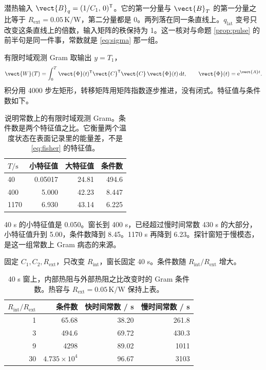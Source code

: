 潜热输入 \(\vect{B}_q=(1/C_1,\,0)^{\mathsf T}\)。它的第一分量与 \(\vect{B}_T\) 的第一分量之比等于 \(R_{\mathrm{ext}}=0.05\,\mathrm{K/W}\)，第二分量都是 0。两列落在同一条直线上。\(q_{\mathrm{lat}}\) 变号只改变这条直线上的倍数，输入矩阵的秩保持为 1。这一核对与命题 \ref{prop:pulse} 的前半句是同一件事，常数就是 \eqref{eq:sigma} 那一组。

有限时域观测 Gram 取输出 \(y=T_1\)，
\begin{equation}
\label{eq:gram}
\vect{W}(T)=\int_0^{T}\vect{\Phi}(t)^{\mathsf T}\vect{C}^{\mathsf T}\vect{C}\,\vect{\Phi}(t)\,\mathrm{d}t,
\qquad
\vect{\Phi}(t)=\mathrm{e}^{\vect{A}t}.
\end{equation}
积分用 4000 步左矩形，转移矩阵用矩阵指数逐步推进，没有闭式。特征值与条件数如下。

\begin{table}[ht]
\centering
\caption{说明常数上的有限时域观测 Gram。条件数是两个特征值之比。它衡量两个温度状态在表面记录里的能量差，不是 \eqref{eq:fisher} 的特征值。}
\begin{tabular}{lrrr}
\toprule
\(T/\mathrm{s}\) & 小特征值 & 大特征值 & 条件数 \\
\midrule
40 & 0.05017 & 24.81 & 494.6 \\
400 & 5.000 & 42.23 & 8.447 \\
1170 & 6.930 & 43.14 & 6.225 \\
\bottomrule
\end{tabular}
\end{table}

40 s 的小特征值是 0.050。窗长到 400 s，已经超过慢时间常数 430 s 的大部分，小特征值升到 5.00，条件数降到 8.45。1170 s 再降到 6.23。探针窗短于慢模态，是这一组常数上 Gram 病态的来源。

固定 \(C_1,C_2,R_{\mathrm{ext}}\)，只改变 \(R_{\mathrm{int}}\)，窗长固定 40 s。条件数随 \(R_{\mathrm{int}}/R_{\mathrm{ext}}\) 增大。

\begin{table}[ht]
\centering
\caption{40 s 窗上，内部热阻与外部热阻之比改变时的 Gram 条件数。热容与 \(R_{\mathrm{ext}}=0.05\,\mathrm{K/W}\) 保持上表。}
\begin{tabular}{rrrr}
\toprule
\(R_{\mathrm{int}}/R_{\mathrm{ext}}\) & 条件数 & 快时间常数 / s & 慢时间常数 / s \\
\midrule
1 & 65.68 & 38.20 & 261.8 \\
3 & 494.6 & 69.72 & 430.3 \\
9 & 4298 & 89.02 & 1011 \\
30 & \(4.735\times 10^{4}\) & 96.67 & 3103 \\
\bottomrule
\end{tabular}
\end{table}

